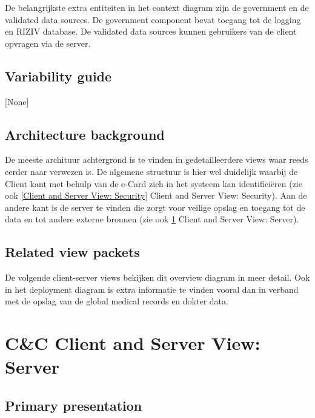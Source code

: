 \documentclass[a4paper,10pt]{article}
\begin{document}
De belangrijkste extra entiteiten in het context diagram zijn de government en de validated data sources.  De government component bevat toegang tot de logging en RIZIV database.  De validated data sources kunnen gebruikers van de client opvragen via de server.

\subsection{Variability guide}
[None]

\subsection{Architecture background}
De meeste archituur achtergrond is te vinden in gedetailleerdere views waar reeds eerder naar verwezen is.  De algemene structuur is hier wel duidelijk waarbij de Client kant met behulp van de e-Card zich in het systeem kan identifici\"{e}ren (zie ook \ref{Client and Server View: Security} Client and Server View: Security).  Aan de andere kant is de server te vinden die zorgt voor veilige opslag en toegang tot de data en tot andere externe bronnen (zie ook \ref{Client and Server View: Server} Client and Server View: Server).

\subsection{Related view packets}
De volgende client-server views bekijken dit overview diagram in meer detail.  Ook in het deployment diagram is extra informatie te vinden vooral dan in verband met de opslag van de global medical records en dokter data.



\clearpage
\section{C\&C Client and Server View: Server}
\label{Client and Server View: Server}
\subsection{Primary presentation}
\end{document}
